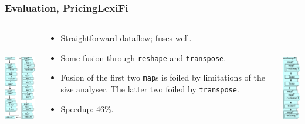 \documentclass[rgb,dvipsnames]{beamer}
\begin{document}
\begin{frame}
  \frametitle{Evaluation, PricingLexiFi}

\begin{columns}
\begin{column}{0.2\textwidth}
  \includegraphics[height=5cm]{img/PricingLexiFi-unfused.pdf}
\end{column}
\begin{column}{0.6\textwidth}
\begin{itemize}
\item Straightforward dataflow; fuses well.
  \item Some fusion through \texttt{reshape} and \texttt{transpose}.
  \item Fusion of the first two \texttt{map}s is foiled by limitations
    of the size analyser.  The latter two foiled by \texttt{transpose}.
  \item Speedup: 46\%.
\end{itemize}
\end{column}
\begin{column}{0.2\textwidth}
  \includegraphics[height=5cm]{img/PricingLexiFi-fused.pdf}
\end{column}
\end{columns}

\end{frame}
\end{document}
